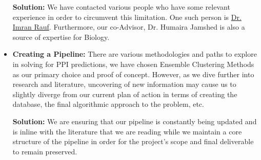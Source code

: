 \begin{itemize}
    \textbf{Solution:} We have contacted various people who have some relevant experience in order to circumvent this limitation. One such person is \href{https://oric.iba.edu.pk/profile.php?id=irauf}{Dr. Imran Rauf}. Furthermore, our co-Advisor, Dr. Humaira Jamshed is also a source of expertise for Biology.
    
    \item \textbf{Creating a Pipeline:} There are various methodologies and paths to explore in solving for PPI predictions, we have chosen Ensemble Clustering Methods as our primary choice and proof of concept. However, as we dive further into research and literature, uncovering of new information may cause us to slightly diverge from our current plan of action in terms of creating the database, the final algorithmic approach to the problem, etc.
    
    \textbf{Solution:} We are ensuring that our pipeline is constantly being updated and is inline with the literature that we are reading while we maintain a core structure of the pipeline in order for the project's scope and final deliverable to remain preserved.
\end{itemize}